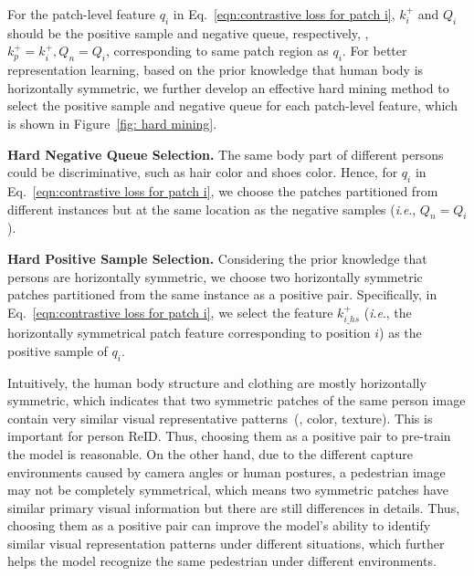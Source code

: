\documentclass[10pt,twocolumn,letterpaper]{article}
\newcommand{\tcr}{\textcolor{red}}
\newcommand{\ieno}{\textit{i}.\textit{e}.}
\begin{document}

For the patch-level feature $q_i$ in Eq.~\ref{eqn:contrastive loss for patch i}, $k^+_i$ and $Q_i$ should be the positive sample and negative queue, respectively, \ie, $k^+_p=k^+_i,Q_n=Q_i$, corresponding to same patch region as $q_i$. For better representation learning, based on the prior knowledge that human body is horizontally symmetric, we further develop an effective hard mining method to select the positive sample and negative queue for each patch-level feature, which is shown in Figure~\ref{fig: hard mining}. 

\noindent\textbf{Hard Negative Queue Selection.}
The same body part of different persons could be discriminative, such as hair color and shoes color. Hence, for $q_i$ in Eq.~\ref{eqn:contrastive loss for patch i}, we choose the patches partitioned from different instances but at the same location as the negative samples (\ieno, $Q_n=Q_i$).

\noindent\textbf{Hard Positive Sample Selection.}
Considering the prior knowledge that persons are horizontally symmetric, we choose two horizontally symmetric patches partitioned from the same instance as a positive pair. 
Specifically, in Eq.~\ref{eqn:contrastive loss for patch i}, we select the feature $k^+_{i\_hs}$ (\ieno, the horizontally symmetrical patch feature corresponding to position $i$) as the positive sample of $q_i$.

Intuitively, the human body structure and clothing are mostly horizontally symmetric, which indicates that two symmetric patches of the same person image contain very similar visual representative patterns~(\eg, color, texture). This is important for person ReID. Thus, choosing them as a positive pair to pre-train the model is reasonable.
On the other hand, due to the different capture environments caused by camera angles or human postures, a pedestrian image may not be completely symmetrical, which means two symmetric patches have similar primary visual information but there are still differences in details. Thus, choosing them as a positive pair can improve the model's ability to identify similar visual representation patterns under different situations, which further helps the model recognize the same pedestrian under different environments.
\end{document}
